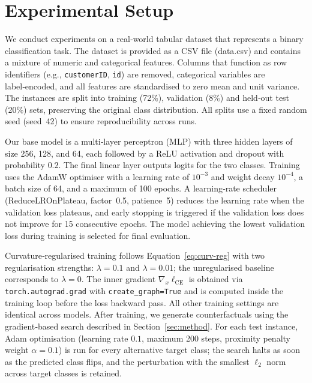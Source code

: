 \documentclass[11pt,a4paper]{article}
\begin{document}
\section{Experimental Setup}
\label{sec:setup}
We conduct experiments on a real‑world tabular dataset that represents a binary classification task. The dataset is provided as a CSV file (data.csv) and contains a mixture of numeric and categorical features. Columns that function as row identifiers (e.g., \texttt{customerID}, \texttt{id}) are removed, categorical variables are label‑encoded, and all features are standardised to zero mean and unit variance. The instances are split into training (72\%), validation (8\%) and held‑out test (20\%) sets, preserving the original class distribution. All splits use a fixed random seed (seed~42) to ensure reproducibility across runs.

Our base model is a multi‑layer perceptron (MLP) with three hidden layers of size 256, 128, and 64, each followed by a ReLU activation and dropout with probability \(0.2\). The final linear layer outputs logits for the two classes. Training uses the AdamW optimiser with a learning rate of \(10^{-3}\) and weight decay \(10^{-4}\), a batch size of 64, and a maximum of 100 epochs. A learning‑rate scheduler (ReduceLROnPlateau, factor~0.5, patience~5) reduces the learning rate when the validation loss plateaus, and early stopping is triggered if the validation loss does not improve for 15 consecutive epochs. The model achieving the lowest validation loss during training is selected for final evaluation.

Curvature‑regularised training follows Equation~\eqref{eq:curv-reg} with two regularisation strengths: \(\lambda = 0.1\) and \(\lambda = 0.01\); the unregularised baseline corresponds to \(\lambda = 0\). The inner gradient \(\nabla_x \ell_{\mathrm{CE}}\) is obtained via \texttt{torch.autograd.grad} with \texttt{create\_graph=True} and is computed inside the training loop before the loss backward pass. All other training settings are identical across models. After training, we generate counterfactuals using the gradient‑based search described in Section~\ref{sec:method}. For each test instance, Adam optimisation (learning rate \(0.1\), maximum 200 steps, proximity penalty weight \(\alpha = 0.1\)) is run for every alternative target class; the search halts as soon as the predicted class flips, and the perturbation with the smallest \(\ell_2\) norm across target classes is retained.
\end{document}
